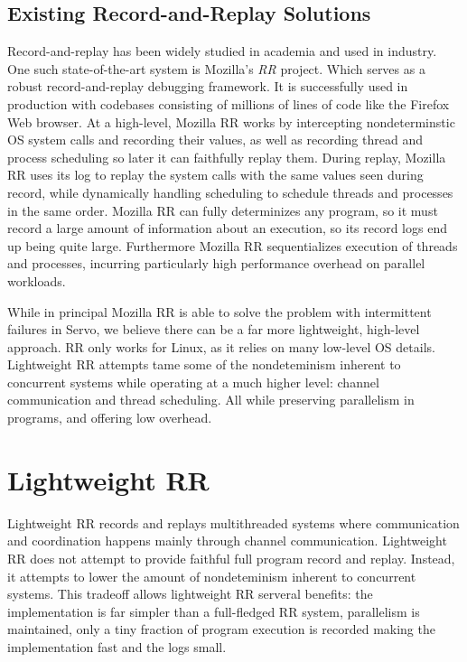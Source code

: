\documentclass{article}
\begin{document}
\subsection{Existing Record-and-Replay Solutions}
Record-and-replay has been widely studied in academia and used in industry. One
such state-of-the-art system is Mozilla's \textit{RR} project. Which serves
as a robust record-and-replay debugging framework. It is successfully used in production
with codebases consisting of millions of lines of code like the Firefox Web browser.
At a high-level, Mozilla RR works by intercepting nondeterminstic OS system calls and recording
their values, as well as recording thread and process scheduling so later it can faithfully
replay them. During replay, Mozilla RR uses its log to replay the system calls with the same
values seen during record, while dynamically handling scheduling to schedule threads
and processes in the same order. Mozilla RR can fully determinizes any program,
so it must record a large amount of information about an execution, so its record logs
end up being quite large. Furthermore Mozilla RR sequentializes execution of threads and
processes, incurring particularly high performance overhead on parallel workloads.

While in principal Mozilla RR is able to solve the problem with intermittent failures in Servo,
we believe there can be a far more lightweight, high-level approach.
RR only works for Linux, as it relies on many low-level OS details.
Lightweight RR attempts tame some of the nondeteminism inherent to concurrent systems
while operating at a much higher level: channel communication and thread scheduling.
All while preserving parallelism in programs, and offering low overhead.

\section{Lightweight RR}
Lightweight RR records and replays multithreaded systems
where communication and coordination happens mainly through channel communication.
Lightweight RR does not attempt to provide faithful full program record and replay. Instead,
it attempts to lower the amount of nondeteminism inherent to concurrent systems. This tradeoff
allows lightweight RR serveral benefits: the implementation is far simpler than
a full-fledged RR system, parallelism is maintained, only a tiny fraction of program
execution is recorded making the implementation fast and the logs small.
\end{document}
